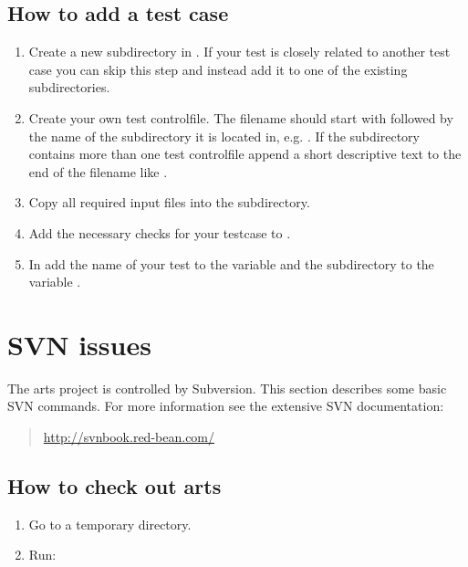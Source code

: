 \subsection{How to add a test case}
\begin{enumerate}
\item Create a new subdirectory in . If your test is closely
  related to another test case you can skip this step and instead add it
  to one of the existing subdirectories.
\item Create your own test controlfile. The filename should start with
   followed by the name of the subdirectory it is located in,
  e.g. . If the subdirectory contains more
  than one test controlfile append a short descriptive text to the end of the
  filename like .
\item Copy all required input files into the subdirectory.
\item Add the necessary checks for your testcase to
  .
\item In  add the name of your test to the
  variable  and the subdirectory to the variable
  .

\end{enumerate}


\section{SVN issues}

The arts project is controlled by Subversion. This section describes some
basic SVN commands. For more information see the extensive SVN
documentation:
\begin{quote}
  \url{http://svnbook.red-bean.com/}
\end{quote}




\subsection{How to check out arts}
\begin{enumerate}
\item Go to a temporary directory.
\item Run: 
\end{enumerate}


